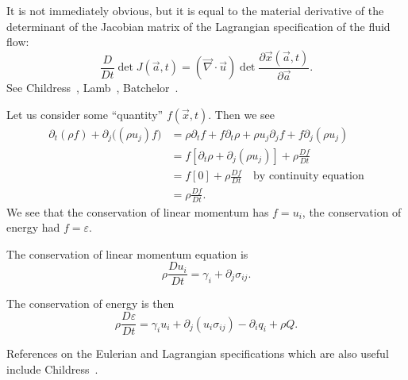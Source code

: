 \begin{remark}
It is not immediately obvious, but it is equal to
the material derivative of the determinant of the Jacobian matrix of the Lagrangian specification
of the fluid flow:
\begin{equation*}
\frac{D}{D t}\det J(\vec{a},t)=(\vec{\nabla}\cdot\vec{u})\det\frac{\partial\vec{x}(\vec{a},t)}{\partial\vec{a}}.
\end{equation*}
See Childress~\cite[\S1.2]{childress2009introduction},
Lamb~\cite[\S6]{lamb1930hydrodynamics}, Batchelor~\cite[Eq~(2.2.3)~\textit{et~seq.}]{batchelor1973introduction}.
\end{remark}

\begin{node}
Let us consider some ``quantity'' $f(\vec{x},t)$. Then we see
\begin{subequations}
  \begin{align}
\partial_{t}(\rho f)+\partial_{j}\bigl((\rho u_{j})f\bigr)
&=\rho\partial_{t}f+f\partial_{t}\rho+\rho u_{j}\partial_{j}f+f\partial_{j}(\rho u_{j})\\
&=f[\partial_{t}\rho+\partial_{j}(\rho u_{j})]+\rho\frac{D f}{D t}\\
&=f[0] + \rho\frac{D f}{D t}\quad\mbox{by continuity equation}\\
&=\rho\frac{D f}{D t}.
  \end{align}
\end{subequations}
We see that the conservation of linear momentum has $f=u_{i}$, 
the conservation of energy had $f=\varepsilon$.
\end{node}

\begin{node}
The conservation of linear momentum equation is
\begin{equation*}
\rho\frac{D u_{i}}{D t}=\gamma_{i}+\partial_{j}\sigma_{ij}.
\end{equation*}
\end{node}

\begin{node}
The conservation of energy is then
\begin{equation*}
\rho\frac{D\varepsilon}{D t}=\gamma_{i}u_{i}+\partial_{j}(u_{i}\sigma_{ij})-\partial_{i}q_{i}+\rho Q.
\end{equation*}
\end{node}

\begin{remark}
References on the Eulerian and Lagrangian specifications which are also useful include Childress~\cite[Ch~1]{childress2009introduction}.
\end{remark}